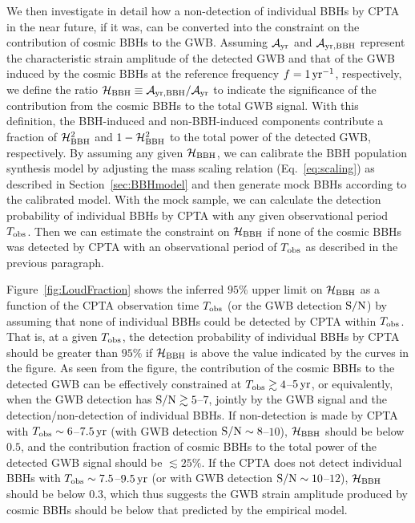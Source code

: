 \documentclass[twocolumn]{aastex631}
\newcommand{\calA}{{\mathcal{A}}}
\newcommand{\calH}{{\mathcal{H}}}
\newcommand{\obs}{_{\rm obs}}
\newcommand{\snr}{{\rm S/N}}
\newcommand{\yr}{{\rm\,yr}}
\newcommand{\iyr}{{\rm\,yr^{-1}}}
\begin{document}
We then investigate in detail how a non-detection of individual BBHs by CPTA in
the near future, if it was, can be converted into the constraint on the
contribution of cosmic BBHs to the GWB. Assuming $\calA_{\rm yr}$ and
$\calA_{\rm yr,BBH}$ represent the characteristic strain amplitude of the
detected GWB and that of the GWB induced by the cosmic BBHs at the reference
frequency $f=1\iyr$, respectively, we define the ratio $\calH_{\rm BBH}\equiv
\calA_{\rm yr,BBH}/\calA_{\rm yr}$ to indicate the significance of the
contribution from the cosmic BBHs to the total GWB signal. With this definition,
the BBH-induced and non-BBH-induced components contribute a fraction of
$\calH_{\rm BBH}^2$ and $1-\calH_{\rm BBH}^2$ to the total power of the detected
GWB, respectively. By assuming any given $\calH_{\rm BBH}$, we can calibrate the
BBH population synthesis model by adjusting the mass scaling relation
(Eq.~\ref{eq:scaling}) as described in Section~\ref{sec:BBHmodel} and then
generate mock BBHs according to the calibrated model. With the mock sample, we
can calculate the detection probability of individual BBHs by CPTA with any
given observational period $T\obs$. Then we can estimate the constraint on
$\calH_{\rm BBH}$ if none of the cosmic BBHs was detected by CPTA with an
observational period of $T\obs$ as described in the previous paragraph.

Figure~\ref{fig:LoudFraction} shows the inferred $95\%$ upper limit on
$\calH_{\rm BBH}$ as a function of the CPTA observation time $T\obs$ (or the GWB
detection $\snr$) by assuming that none of individual BBHs could be detected by
CPTA within $T\obs$. That is, at a given $T\obs$, the detection probability of
individual BBHs by CPTA should be greater than $95\%$ if $\calH_{\rm BBH}$ is
above the value indicated by the curves in the figure. As seen from the figure,
the contribution of the cosmic BBHs to the detected GWB can be effectively
constrained at $T\obs\gtrsim 4$--$5\yr$, or equivalently, when the GWB detection
has $\snr\gtrsim 5$--$7$, jointly by the GWB signal and the
detection/non-detection of individual BBHs. If non-detection is made by CPTA
with $T\obs\sim 6$--$7.5\yr$ (with GWB detection $\snr\sim 8$--$10$),
$\calH_{\rm BBH}$ should be below $0.5$, and the contribution fraction of cosmic
BBHs to the total power of the detected GWB signal should be $\lesssim 25\%$. If
the CPTA does not detect individual BBHs with $T\obs\sim 7.5$--$9.5\yr$ (or with
GWB detection $\snr\sim 10$--$12$), $\calH_{\rm BBH}$ should be below $0.3$,
which thus suggests the GWB strain amplitude produced by cosmic BBHs should be
below that predicted by the empirical model.
\end{document}
